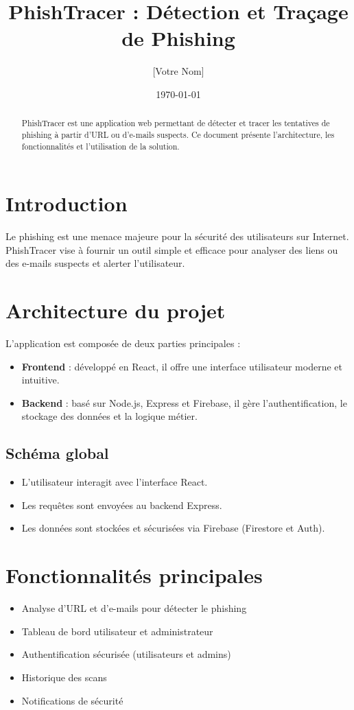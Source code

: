\documentclass[12pt,a4paper]{report}
\title{PhishTracer : Détection et Traçage de Phishing}
\author{[Votre Nom]}
\date{\today}
\begin{document}
\maketitle

\begin{abstract}
PhishTracer est une application web permettant de détecter et tracer les tentatives de phishing à partir d'URL ou d'e-mails suspects. Ce document présente l'architecture, les fonctionnalités et l'utilisation de la solution.
\end{abstract}

\tableofcontents

\chapter{Introduction}
Le phishing est une menace majeure pour la sécurité des utilisateurs sur Internet. PhishTracer vise à fournir un outil simple et efficace pour analyser des liens ou des e-mails suspects et alerter l'utilisateur.

\chapter{Architecture du projet}
L'application est composée de deux parties principales :
\begin{itemize}
  \item \textbf{Frontend} : développé en React, il offre une interface utilisateur moderne et intuitive.
  \item \textbf{Backend} : basé sur Node.js, Express et Firebase, il gère l'authentification, le stockage des données et la logique métier.
\end{itemize}

\section{Schéma global}
\begin{itemize}
  \item L'utilisateur interagit avec l'interface React.
  \item Les requêtes sont envoyées au backend Express.
  \item Les données sont stockées et sécurisées via Firebase (Firestore et Auth).
\end{itemize}

\chapter{Fonctionnalités principales}
\begin{itemize}
  \item Analyse d'URL et d'e-mails pour détecter le phishing
  \item Tableau de bord utilisateur et administrateur
  \item Authentification sécurisée (utilisateurs et admins)
  \item Historique des scans
  \item Notifications de sécurité
\end{itemize}
\end{document}
